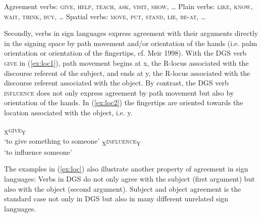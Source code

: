 \documentclass[11pt,a4paper,fleqn]{article}
\begin{document}
\begin{exe}
\ex 	\label{ex:verbclasses}
\begin{xlist}
\ex	Agreement verbs: \textsc{give, help, teach, ask, visit, show,} …	
\ex Plain verbs: \textsc{like, know, wait, think, buy,} …
\ex Spatial verbs: \textsc{move, put, stand, lie, be-at,}  …
\end{xlist}
\end{exe}

Secondly, verbs in sign languages express agreement with their arguments directly in the signing space by path movement and/or orientation of the hands (i.e. palm orientation or orientation of the fingertips, cf. Meir 1998). With the DGS verb \textsc{give} in (\ref{ex:loc1}), path movement begins at x, the R-locus associated with the discourse referent of the subject, and ends at y, the R-locus associated with the discourse referent associated with the object. By contrast, the DGS verb \textsc{influence} does not only express agreement by path movement but also by orientation of the hands. In (\ref{ex:loc2}) the fingertips are oriented towards the location associated with the object, i.e. y.  

\begin{exe}
	\ex \label{ex:loc}
	\begin{xlist}	
	\ex \textsubscript{X}\textsc{give}\textsubscript{Y} 	\\
		‘to give something to someone’	\label{ex:loc1}
	\ex \textsubscript{X}\textsc{influence}\textsubscript{Y}\\
		‘to influence someone’			\label{ex:loc2}
	\end{xlist}
\end{exe}
	
The examples in (\ref{ex:loc}) also illustrate another property of agreement in sign languages: Verbs in DGS do not only agree with the subject (first argument) but also with the object (second argument). Subject and object agreement is the standard case not only in DGS but also in many different unrelated sign languages.
\end{document}

